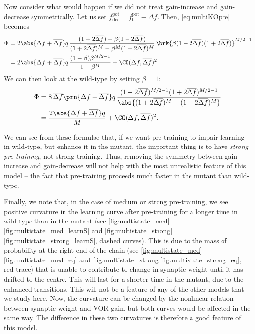 \documentclass[12pt]{article}
\newcommand{\pot}{^{\text{pot}}}
\newcommand{\norm}{_0}
\newcommand{\dec}{_{\text{dec}}}
\begin{document}
Now consider what would happen if we did not treat gain-increase and gain-decrease symmetrically.
Let us set $f\pot\dec = f\pot\norm - \overline{\Delta f}$.
Then, \eqref{eq:multiKOpre} becomes
%
\begin{equation}\label{eq:multiKOdiffpre}
\begin{aligned}
  \Phi &= 2\abs{\Delta f + \overline{\Delta f}} q \, \frac{(1+2\overline{\Delta f}) - \beta(1-2\overline{\Delta f})}
          {(1+2\overline{\Delta f})^M - \beta^M(1-2\overline{\Delta f})^M}   \,
          \brk{\beta (1-2\overline{\Delta f}) (1+2\overline{\Delta f})}^{M/2-1} \\
       &= 2\abs{\Delta f + \overline{\Delta f}} q\,\frac{(1-\beta)\beta^{M/2-1}}{1-\beta^M} + \CO(\Delta f,\overline{\Delta f})^2.
\end{aligned}
\end{equation}
%
We can then look at the wild-type by setting $\beta=1$:
%
\begin{equation}\label{eq:multiWTdiffpre}
\begin{aligned}
  \Phi &= 8\,\overline{\Delta f}\prn{\Delta f + \overline{\Delta f}} q \,
          \frac{(1-2\overline{\Delta f})^{M/2-1} (1+2\overline{\Delta f})^{M/2-1} }
          {\abs{(1+2\overline{\Delta f})^M - (1-2\overline{\Delta f})^M}}   \\
       &= \frac{2\abs{\Delta f + \overline{\Delta f}} q}{M} + \CO(\Delta f,\overline{\Delta f})^2.
\end{aligned}
\end{equation}
%

We can see from these formulae that, if we want pre-training to impair learning in wild-type, but enhance it in the mutant, the important thing is to have \emph{strong pre-training}, not strong training.
Thus, removing the symmetry between gain-increase and gain-decrease will not help with the most unrealistic feature of this model -- the fact that pre-training proceeds much faster in the mutant than wild-type.

Finally, we note that, in the case of medium or strong pre-training, we see positive curvature in the learning curve after pre-training for a longer time in wild-type than in the mutant (see \autoref{fig:multistate_med}\ref{fig:multistate_med_learnS} and \autoref{fig:multistate_strong}\ref{fig:multistate_strong_learnS}, dashed curves).
This is due to the mass of probability at the right end of the chain (see \autoref{fig:multistate_med}\ref{fig:multistate_med_eq} and \autoref{fig:multistate_strong}\ref{fig:multistate_strong_eq}, red trace) that is unable to contribute to change in synaptic weight until it has drifted to the centre.
This will last for a shorter time in the mutant, due to the enhanced transitions.
This will not be a feature of any of the other models that we study here.
Now, the curvature can be changed by the nonlinear relation between synaptic weight and VOR gain, but both curves would be affected in the same way.
The difference in these two curvatures is therefore a good feature of this model.
\end{document}
